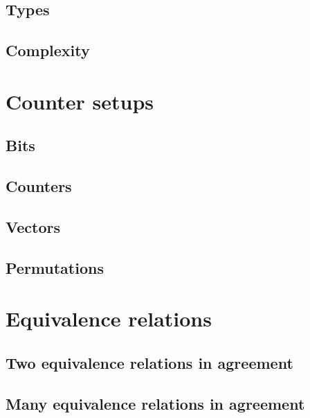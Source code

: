 \documentclass{scrbook}
\begin{document}
\section{Types}


\section{Complexity}





\chapter{Counter setups}
\section{Bits}


\section{Counters}


\section{Vectors}


\section{Permutations}


\chapter{Equivalence relations}


\section{Two equivalence relations in agreement}


\section{Many equivalence relations in agreement}

\end{document}
